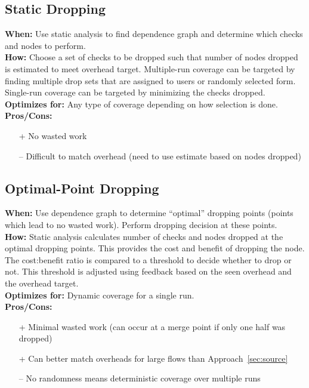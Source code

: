 \documentclass[11pt, letterpaper]{article}
\begin{document}
\subsection{Static Dropping}
\label{sec:static}
\textbf{When: } Use static analysis to find dependence graph and determine
which checks and nodes to perform. \\
\textbf{How: } Choose a set of checks to be dropped such that number of nodes
dropped is estimated to meet overhead target. Multiple-run coverage can be
targeted by finding multiple drop sets that are assigned to users or randomly
selected form. Single-run coverage can be targeted by minimizing the checks dropped. \\
\textbf{Optimizes for: } Any type of coverage depending on how selection is done. \\
\textbf{Pros/Cons: }
\begin{itemize}
  \item[+] No wasted work
  \item[--] Difficult to match overhead (need to use estimate based on nodes dropped)
\end{itemize}

\subsection{Optimal-Point Dropping}
\label{sec:opt}
\textbf{When: } Use dependence graph to determine ``optimal'' dropping points
(points which lead to no wasted work). Perform dropping decision at these
points. \\
\textbf{How: } Static analysis calculates number of checks and nodes dropped at
the optimal dropping points. This provides the cost and benefit of dropping the
node. The cost:benefit ratio is compared to a threshold to decide whether to
drop or not. This threshold is adjusted using feedback based on the seen overhead and
the overhead target.  \\
\textbf{Optimizes for: } Dynamic coverage for a single run. \\
\textbf{Pros/Cons: }
\begin{itemize}
  \item[+] Minimal wasted work (can occur at a merge point if only one half was dropped)
  \item[+] Can better match overheads for large flows than Approach~\ref{sec:source}
  \item[--] No randomness means deterministic coverage over multiple runs
\end{itemize}
\end{document}

